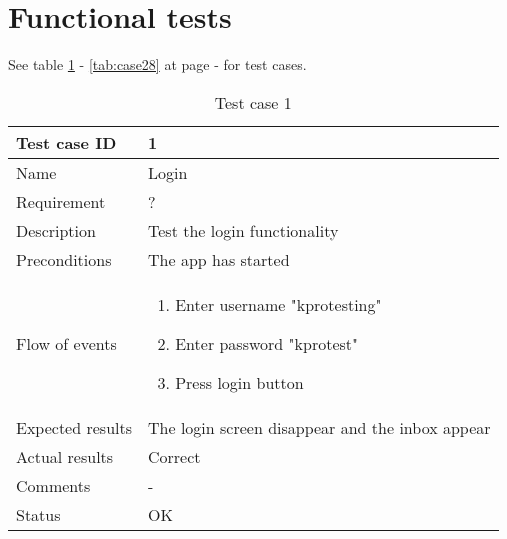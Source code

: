 \section{Functional tests}
		See table \ref{tab:case1} - \ref{tab:case28} at page \pageref{tab:case1} - \pageref{tab:case28} for test cases.
		\begin{table}
			\begin{tabular}{l|p{10cm}}
				Test case ID & 1 \\ \hline
				Name & Login\\ \hline
				Requirement & ? \\ \hline
				Description & Test the login functionality\\ \hline
				Preconditions & The app has started\\ \hline
				Flow of events & 
					\begin{enumerate}
						\item{}Enter username "kprotesting"
						\item{}Enter password "kprotest"
						\item{}Press login button
					\end{enumerate} \\ \hline
				Expected results & The login screen disappear and the inbox appear\\ \hline
				Actual results & Correct\\ \hline
				Comments & -\\ \hline
				Status & OK\\ \hline
			\end{tabular}
			\caption{Test case 1} \label{tab:case1}
		\end{table}


